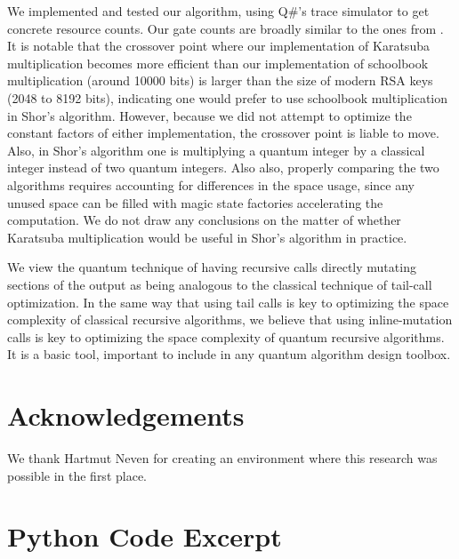 \documentclass[onecolumn]{quantumarticle}
\begin{document}
We implemented and tested our algorithm, using Q\#'s trace simulator to get concrete resource counts.
Our gate counts are broadly similar to the ones from \cite{parent2017karatsuba}.
It is notable that the crossover point where our implementation of Karatsuba multiplication becomes more efficient than our implementation of schoolbook multiplication (around 10000 bits) is larger than the size of modern RSA keys (2048 to 8192 bits), indicating one would prefer to use schoolbook multiplication in Shor's algorithm.
However, because we did not attempt to optimize the constant factors of either implementation, the crossover point is liable to move.
Also, in Shor's algorithm one is multiplying a quantum integer by a classical integer instead of two quantum integers.
Also also, properly comparing the two algorithms requires accounting for differences in the space usage, since any unused space can be filled with magic state factories accelerating the computation.
We do not draw any conclusions on the matter of whether Karatsuba multiplication would be useful in Shor's algorithm in practice.

We view the quantum technique of having recursive calls directly mutating sections of the output as being analogous to the classical technique of tail-call optimization.
In the same way that using tail calls is key to optimizing the space complexity of classical recursive algorithms, we believe that using inline-mutation calls is key to optimizing the space complexity of quantum recursive algorithms.
It is a basic tool, important to include in any quantum algorithm design toolbox.


\section{Acknowledgements}

We thank Hartmut Neven for creating an environment where this research was possible in the first place.





\appendix

\section{Python Code Excerpt}
\label{app:python}
\end{document}
